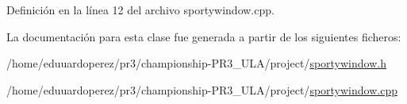 Definición en la línea 12 del archivo sportywindow.\+cpp.



La documentación para esta clase fue generada a partir de los siguientes ficheros\+:\begin{DoxyCompactItemize}
\item 
/home/eduuardoperez/pr3/championship-\/\+P\+R3\+\_\+\+U\+L\+A/project/\hyperlink{sportywindow_8h}{sportywindow.\+h}\item 
/home/eduuardoperez/pr3/championship-\/\+P\+R3\+\_\+\+U\+L\+A/project/\hyperlink{sportywindow_8cpp}{sportywindow.\+cpp}\end{DoxyCompactItemize}
